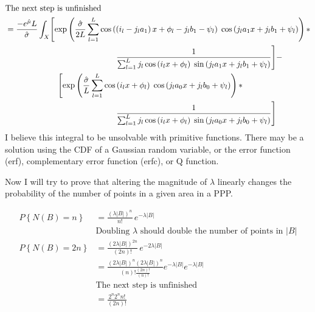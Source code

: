 \documentclass[12pt,dvipsnames]{report}
\begin{document}
\begin{align}
&\text{The next step is unfinished} \nonumber \\
&= \frac{-e^{\hat{\mu}} L}{\hat{\sigma}} \int_X \Biggl[ \exp\left( \frac{\hat{\sigma}}{2L} \sum_{l=1}^L \cos\left( \left( i_l - j_l a_1 \right) x + \phi_l - j_l b_1 - \psi_l \right) \; \cos\left( j_l a_1 x + j_l b_1 + \psi_l \right) \right) * \nonumber \\
& \hspace{1.9in} \frac{1}{\sum_{l=1}^L j_l \cos\left( i_l x + \phi_l \right) \; \sin\left( j_l a_1 x + j_l b_1 + \psi_l \right)} \Biggr] - \nonumber \\
& \hspace{0.9in} \Biggl[ \exp\left( \frac{\hat{\sigma}}{L} \sum_{l=1}^L \cos\left( i_l x + \phi_l \right) \; \cos\left( j_l a_0 x + j_l b_0 + \psi_l \right) \right) * \nonumber \\
& \hspace{1.9in} \frac{1}{\sum_{l=1}^L j_l \cos\left( i_l x + \phi_l \right) \; \sin\left( j_l a_0 x + j_l b_0 + \psi_l \right)} \Biggr] \\
\end{align}
I believe this integral to be unsolvable with primitive functions.  There may be a solution using the CDF of a Gaussian random variable, or the error function (erf), complementary error function (erfc), or Q function.

Now I will try to prove that altering the magnitude of $\lambda$ linearly changes the probability of the number of points in a given area in a PPP.

\begin{align}
P\left\{ N\left( B \right) = n \right\} &= \frac{\left( \lambda | B | \right)^n}{n!} \, e^{-\lambda | B |} \\
& \text{Doubling $\lambda$ should double the number of points in $| B |$} \nonumber \\
P\left\{ N\left( B \right) = 2n \right\} &= \frac{\left( 2 \lambda | B | \right)^{2n}}{\left( 2n \right)!} \, e^{-2 \lambda | B |} \\
&= \frac{\left( 2 \lambda | B | \right)^n \left( 2 \lambda | B | \right)^n}{\left( n \right)! \frac{\left( 2n \right)!}{\left( n \right)!}} e^{-\lambda | B |} e^{-\lambda | B |} \\
&\text{The next step is unfinished} \nonumber \\
&= \frac{2^n 2^n n!}{\left( 2n \right)!}
\end{align}

\fi



\end{document}
